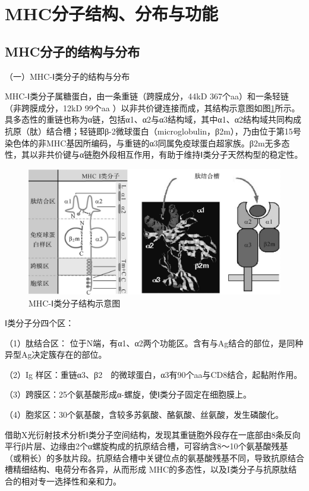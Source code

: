 \section{MHC分子结构、分布与功能}


\subsection{MHC分子的结构与分布}

（一）MHC-Ⅰ类分子的结构与分布

MHC-Ⅰ类分子属糖蛋白，由一条重链（跨膜成分，44kD
367个aa）和一条轻链（非跨膜成分，12kD 99个aa
）以非共价键连接而成，其结构示意图如图\ref{fig7-5}所示。具多态性的重链也称为α链，包括α1、α2与α3结构域，其中α1、α2结构域共同构成抗原（肽）结合槽；轻链即β-2微球蛋白（microglobulin，β2m），乃由位于第15号染色体的非MHC基因所编码，与重链的α3同属免疫球蛋白超家族。β2m无多态性，其以非共价键与α链胞外段相互作用，有助于维持Ⅰ类分子天然构型的稳定性。

\begin{figure}[!htbp]
 \centering
 \includegraphics{./images/Image00106.jpg}
 \captionsetup{justification=centering}
 \caption{MHC-Ⅰ类分子结构示意图}
 \label{fig7-5}
  \end{figure} 

Ⅰ类分子分四个区：

（1）肽结合区：
位于N端，有α1、α2两个功能区。含有与Ag结合的部位，是同种异型Ag决定簇存在的部位。

（2）Ig 样区：重链α3、β2　的微球蛋白，α3有90个aa与CD8结合，起黏附作用。

（3）跨膜区：25个氨基酸形成α-螺旋，使Ⅰ类分子固定在细胞膜上。

（4）胞浆区：30个氨基酸，含较多苏氨酸、酪氨酸、丝氨酸，发生磷酸化。

借助X光衍射技术分析Ⅰ类分子空间结构，发现其重链胞外段存在一底部由8条反向平行β片层、边缘由2个α螺旋构成的抗原结合槽，可容纳含8～10个氨基酸残基（或稍长）的多肽片段。抗原结合槽中关键位点的氨基酸残基不同，导致抗原结合槽精细结构、电荷分布各异，从而形成
MHC的多态性，以及I类分子与抗原肽结合的相对专一选择性和亲和力。

